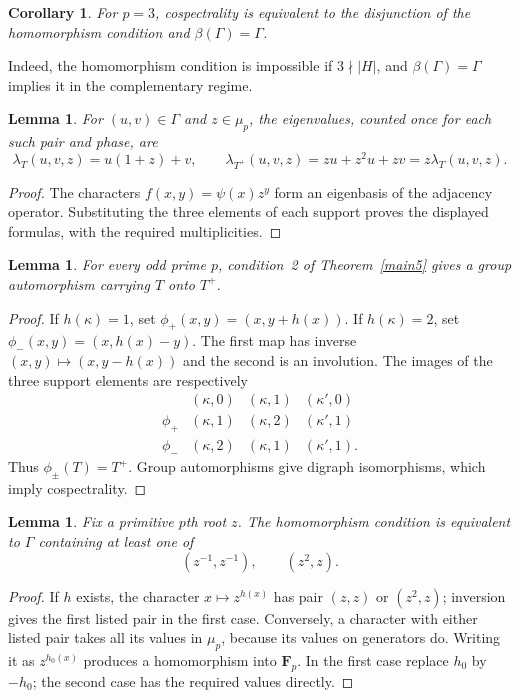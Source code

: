 \documentclass[11pt]{article}
\newtheorem{lemma}[theorem]{Lemma}
\newtheorem{corollary}[theorem]{Corollary}
\theoremstyle{remark}\newtheorem{remark}[theorem]{Remark}
\newcommand{\Fp}{\mathbf F_p}
\begin{document}
\begin{corollary}\label{combined}
For $p=3$, cospectrality is equivalent to the disjunction of the homomorphism condition and $\beta(\Gamma)=\Gamma$.
\end{corollary}
Indeed, the homomorphism condition is impossible if $3\nmid|H|$, and $\beta(\Gamma)=\Gamma$ implies it in the complementary regime.

\begin{lemma}\label{spectral}
For $(u,v)\in\Gamma$ and $z\in\mu_p$, the eigenvalues, counted once for each such pair and phase, are
\[
\lambda_T(u,v,z)=u(1+z)+v,\qquad
\lambda_{T^+}(u,v,z)=z u+z^2u+zv=z\lambda_T(u,v,z).
\]
\end{lemma}
\begin{proof}
The characters $f(x,y)=\psi(x)z^y$ form an eigenbasis of the adjacency operator. Substituting the three elements of each support proves the displayed formulas, with the required multiplicities.
\end{proof}

\begin{lemma}\label{suffh}
For every odd prime $p$, condition~2 of Theorem~\ref{main5} gives a group automorphism carrying $T$ onto $T^+$.
\end{lemma}
\begin{proof}
If $h(\kappa)=1$, set $\phi_+(x,y)=(x,y+h(x))$. If $h(\kappa)=2$, set $\phi_-(x,y)=(x,h(x)-y)$. The first map has inverse $(x,y)\mapsto(x,y-h(x))$ and the second is an involution. The images of the three support elements are respectively
\[
\begin{array}{c|ccc}
 & (\kappa,0)&(\kappa,1)&(\kappa',0)\\\hline
\phi_+ &(\kappa,1)&(\kappa,2)&(\kappa',1)\\
\phi_- &(\kappa,2)&(\kappa,1)&(\kappa',1).
\end{array}
\]
Thus $\phi_\pm(T)=T^+$. Group automorphisms give digraph isomorphisms, which imply cospectrality.
\end{proof}

\begin{lemma}\label{dualh}
Fix a primitive $p$th root $z$. The homomorphism condition is equivalent to $\Gamma$ containing at least one of
\[
(z^{-1},z^{-1}),\qquad (z^2,z).
\]
\end{lemma}
\begin{proof}
If $h$ exists, the character $x\mapsto z^{h(x)}$ has pair $(z,z)$ or $(z^2,z)$; inversion gives the first listed pair in the first case. Conversely, a character with either listed pair takes all its values in $\mu_p$, because its values on generators do. Writing it as $z^{h_0(x)}$ produces a homomorphism into $\Fp$. In the first case replace $h_0$ by $-h_0$; the second case has the required values directly.
\end{proof}
\end{document}
